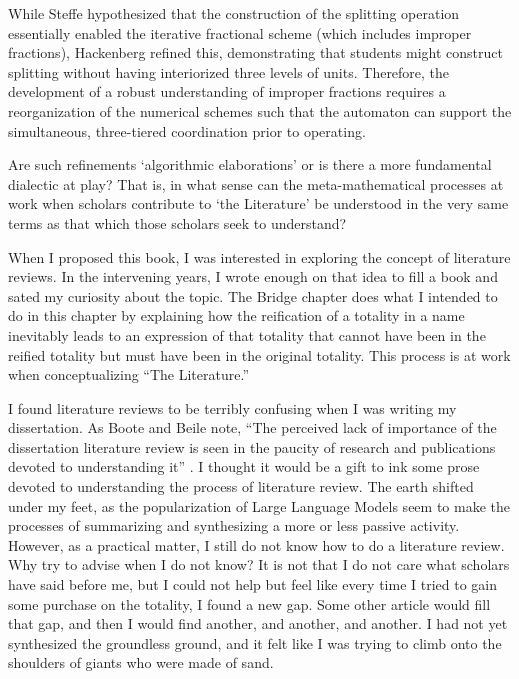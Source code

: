 \documentclass[12pt]{book}
\begin{document}
While Steffe \parencite*{steffe2002new} hypothesized that the construction of the splitting operation essentially enabled the iterative fractional scheme (which includes improper fractions), Hackenberg \parencite*{Hackenberg:2007aa} refined this, demonstrating that students might construct splitting without having interiorized three levels of units. Therefore, the development of a robust understanding of improper fractions requires a reorganization of the numerical schemes such that the automaton can support the simultaneous, three-tiered coordination prior to operating. 

Are such refinements `algorithmic elaborations' or is there a more fundamental dialectic at play? That is, in what sense can the meta-mathematical processes at work when scholars contribute to `the Literature' be understood in the very same terms as that which those scholars seek to understand?


When I proposed this book, I was interested in exploring the concept of literature reviews. In the intervening years, I wrote enough on that idea to fill a book and sated my curiosity about the topic. The Bridge chapter does what I intended to do in this chapter by explaining how the reification of a totality in a name inevitably leads to an expression of that totality that cannot have been in the reified totality but must have been in the original totality. This process is at work when conceptualizing ``The Literature.'' 

I found literature reviews to be terribly confusing when I was writing my dissertation. As Boote and Beile note, ``The perceived lack of importance of the dissertation literature review is seen in the paucity of research and publications devoted to understanding it'' \parencite*[4]{boote2005}. I thought it would be a gift to ink some prose devoted to understanding the process of literature review. The earth shifted under my feet, as the popularization of Large Language Models seem to make the processes of summarizing and synthesizing a more or less passive activity. However, as a practical matter, I still do not know how to do a literature review. Why try to advise when I do not know? It is not that I do not care what scholars have said before me, but I could not help but feel like every time I tried to gain some purchase on the totality, I found a new gap. Some other article would fill that gap, and then I would find another, and another, and another. I had not yet synthesized the groundless ground, and it felt like I was trying to climb onto the shoulders of giants who were made of sand. 
\end{document}
